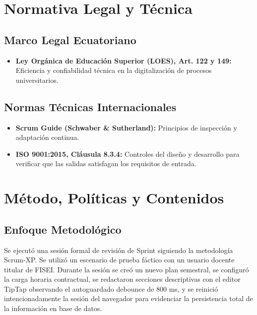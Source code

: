 \documentclass[12pt,a4paper]{article}
\begin{document}
\section{Normativa Legal y Técnica}
\subsection{Marco Legal Ecuatoriano}
\begin{itemize}[leftmargin=1.5em, itemsep=2pt]
    \item \textbf{Ley Orgánica de Educación Superior (LOES), Art. 122 y 149:} Eficiencia y confiabilidad técnica en la digitalización de procesos universitarios.
\end{itemize}
\subsection{Normas Técnicas Internacionales}
\begin{itemize}[leftmargin=1.5em, itemsep=2pt]
    \item \textbf{Scrum Guide (Schwaber \& Sutherland):} Principios de inspección y adaptación continua.
    \item \textbf{ISO 9001:2015, Cláusula 8.3.4:} Controles del diseño y desarrollo para verificar que las salidas satisfagan los requisitos de entrada.
\end{itemize}

\section{Método, Políticas y Contenidos}
\subsection{Enfoque Metodológico}
Se ejecutó una sesión formal de revisión de Sprint siguiendo la metodología Scrum-XP. Se utilizó un escenario de prueba fáctico con un usuario docente titular de FISEI. Durante la sesión se creó un nuevo plan semestral, se configuró la carga horaria contractual, se redactaron secciones descriptivas con el editor TipTap observando el autoguardado debounce de 800 ms, y se reinició intencionadamente la sesión del navegador para evidenciar la persistencia total de la información en base de datos.
\end{document}
